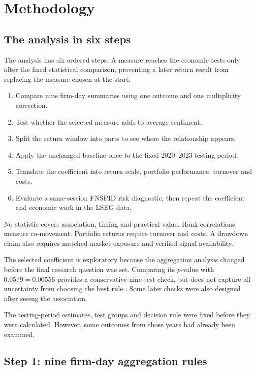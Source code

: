 \chapter{Methodology}
\label{ch:methodology}

\section{The analysis in six steps}

The analysis has six ordered steps. A measure reaches the economic tests only
after the fixed statistical comparison, preventing a later return result from
replacing the measure chosen at the start.

\begin{enumerate}[leftmargin=1.0cm]
  \item Compare nine firm-day summaries using one outcome and one multiplicity
  correction.
  \item Test whether the selected measure adds to average sentiment.
  \item Split the return window into parts to see where the relationship appears.
  \item Apply the unchanged baseline once to the fixed 2020--2023 testing period.
  \item Translate the coefficient into return scale, portfolio performance,
  turnover and costs.
  \item Evaluate a same-session FNSPID risk diagnostic, then repeat the
  coefficient and economic work in the LSEG data.
\end{enumerate}

No statistic covers association, timing and practical value. Rank correlations
measure co-movement. Portfolio returns require turnover and costs. A drawdown
claim also requires matched market exposure and verified signal availability.

The selected coefficient is exploratory because the aggregation analysis
changed before the final research question was set. Comparing its $p$-value with
$0.05/9=0.00556$ provides a conservative nine-test check, but does not capture
all uncertainty from choosing the best rule \citep{harvey2016multiple}. Some
later checks were also designed after seeing the association.

The testing-period estimates, test groups and decision rule were fixed before they
were calculated. However, some outcomes from those years had already been
examined.

\section{Step 1: nine firm-day aggregation rules}


